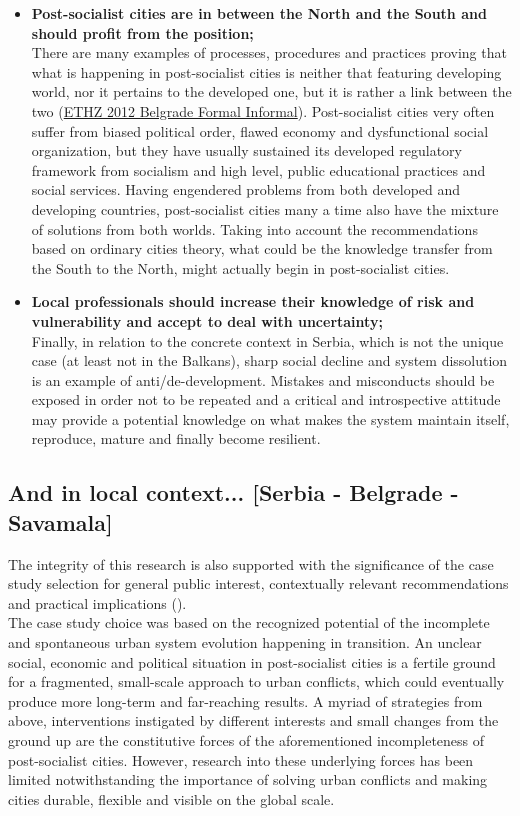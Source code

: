 \documentclass[11pt]{report}
\begin{document}
{{{\begin{itemize}
\item \textbf{Post-socialist cities are in between the North and the South and should profit from the position;}
\\
There are many examples of processes, procedures and practices proving that what is happening in post-socialist cities is neither that featuring developing world, nor it pertains to the developed one, but it is rather a link between the two (\href{ref}{ETHZ 2012 Belgrade Formal Informal}).
Post-socialist cities very often suffer from biased political order, flawed economy and  dysfunctional social organization, but they have usually sustained its developed regulatory framework from socialism and high level, public educational practices and social services.
Having engendered problems from both developed and developing countries, post-socialist cities many a time also have the mixture of solutions from both worlds. 
Taking into account the recommendations based on ordinary cities theory, what could be the knowledge transfer from the South to the North, might actually begin in post-socialist cities.

\item {\textbf{Local professionals should increase their knowledge of risk and vulnerability and accept to deal with uncertainty;}}
\\
Finally, in relation to the concrete context in Serbia, which is not the unique case (at least not in the Balkans), sharp social decline and system dissolution is an example of anti/de-development.
Mistakes and misconducts should be exposed in order not to be repeated and a critical and introspective attitude may provide a potential knowledge on what makes the system maintain itself, reproduce, mature and finally become resilient.
\end{itemize}

\subsection{And in local context... [Serbia - Belgrade - Savamala]}

The integrity of this research is also supported with the significance of the case study selection for general public interest, contextually relevant recommendations and practical implications (\href{ref}{\citealt{yin_case_2009}}).
\\

The case study choice was based on the recognized potential of the incomplete and spontaneous urban system evolution happening in transition.
An unclear social, economic and political situation in post-socialist cities is a fertile ground for a fragmented, small-scale approach to urban conflicts, which could eventually produce more long-term and far-reaching results.
A myriad of strategies from above, interventions instigated by different interests and small changes from the ground up are the constitutive forces of the aforementioned incompleteness of post-socialist cities.
However, research into these underlying forces has been limited notwithstanding the importance of solving urban conflicts and making cities durable, flexible and visible on the global scale.
\\

}}}
\end{document}
